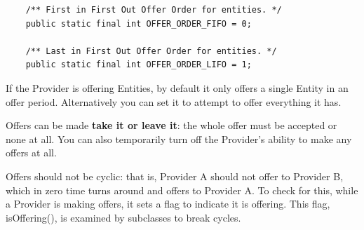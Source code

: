 \documentclass[twoside,10pt]{article}
\begin{document}
\begin{verbatim}
    /** First in First Out Offer Order for entities. */
    public static final int OFFER_ORDER_FIFO = 0;
    
    /** Last in First Out Offer Order for entities. */
    public static final int OFFER_ORDER_LIFO = 1;
\end{verbatim}

If the Provider is offering Entities, by default it only offers a single Entity in an offer period.  Alternatively you can set it to attempt to offer everything it has.

Offers can be made {\bf take it or leave it}: the whole offer must be accepted or none at all.    You can also temporarily turn off the Provider's ability to make any offers at all.

Offers should not be cyclic: that is, Provider A should not offer to Provider B, which in zero time turns around and offers to Provider A.  To check for this, while a Provider is making offers, it sets a flag to indicate it is offering.  This flag, isOffering(), is examined by subclasses to break cycles.
\end{document}
